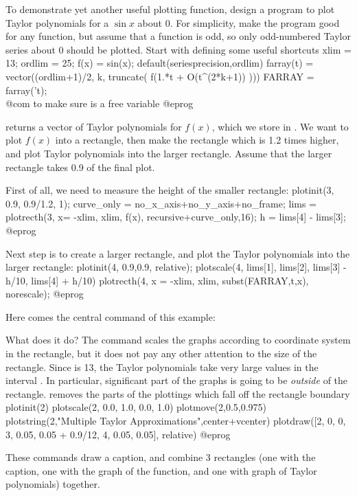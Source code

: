 To demonstrate yet another useful plotting function, design a program to
plot Taylor polynomials for a $\sin x$ about 0.  For simplicity, make the
program good for any function, but assume that a function is odd, so only
odd-numbered Taylor series about 0 should be plotted.  Start with defining
some useful shortcuts
\bprog
xlim = 13;  ordlim = 25;  f(x) = sin(x);
default(seriesprecision,ordlim)
farray(t) = vector((ordlim+1)/2, k, truncate( f(1.*t + O(t^(2*k+1)) )))
FARRAY = farray('t);  \\@com{} to make sure  is a free variable
@eprog

\noindent {} returns a vector of Taylor polynomials for
$f(x)$, which we store in .  We want to plot $f(x)$ into a
rectangle, then make the rectangle which is 1.2 times higher, and plot
Taylor polynomials into the larger rectangle.  Assume that the larger
rectangle takes 0.9 of the final plot.

First of all, we need to measure the height of the smaller rectangle:
\bprog
plotinit(3, 0.9, 0.9/1.2, 1);
curve_only = no_x_axis+no_y_axis+no_frame;
lims = plotrecth(3, x= -xlim, xlim, f(x), recursive+curve_only,16);
h = lims[4] - lims[3];
@eprog

\noindent Next step is to create a larger rectangle, and plot the Taylor
polynomials into the larger rectangle:
\bprog
plotinit(4, 0.9,0.9, relative);
plotscale(4, lims[1], lims[2], lims[3] - h/10, lims[4] + h/10)
plotrecth(4, x = -xlim, xlim, subst(FARRAY,t,x), norescale);
@eprog

Here comes the central command of this example:


\noindent What does it do?  The command 
scales the graphs according to coordinate system in the 
rectangle, but it does not pay any other attention to the size of
the rectangle.  Since  is 13, the Taylor polynomials take 
very large values in the interval .  In particular,
significant part of the graphs is going to be {\it outside} of the rectangle.
 removes the parts of the plottings which fall off the
rectangle boundary
\bprog
plotinit(2)
plotscale(2, 0.0, 1.0, 0.0, 1.0)
plotmove(2,0.5,0.975)
plotstring(2,"Multiple Taylor Approximations",center+vcenter)
plotdraw([2, 0, 0,  3, 0.05, 0.05 + 0.9/12,  4, 0.05, 0.05], relative)
@eprog

These commands draw a caption, and combine 3 rectangles (one with the
caption, one with the graph of the function, and one with graph of Taylor
polynomials) together.

